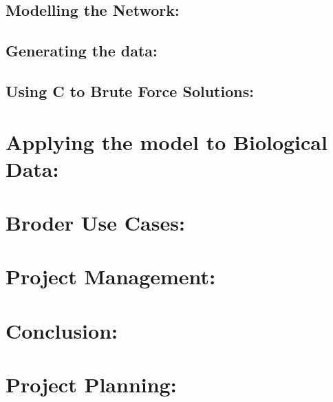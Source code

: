 \documentclass{article}
\begin{document}
\subsection{ Modelling the Network: }

\subsection{ Generating the data: }

\subsection{ Using C to Brute Force Solutions: }


\section{ Applying the model to Biological Data: }


\section{Broder Use Cases: }

\section{Project Management: }


\section{Conclusion:}


 



\section{Project Planning: }

  
\end{document}
